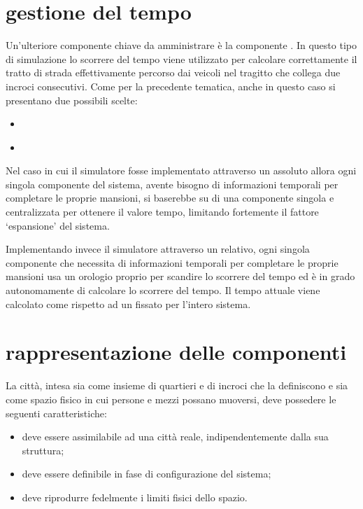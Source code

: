 \section*{gestione del tempo}
\label{problematiche_gestione_del_tempo}
Un'ulteriore componente chiave da amministrare è la componente . In questo tipo di simulazione lo scorrere del tempo viene utilizzato per calcolare correttamente il tratto di strada effettivamente percorso dai veicoli nel tragitto che collega due incroci consecutivi. Come per la precedente tematica, anche in questo caso si presentano due possibili scelte:

\begin{itemize}
\item{ }
\item{ }
\end{itemize}

Nel caso in cui il simulatore fosse implementato attraverso un  assoluto allora ogni singola componente del sistema, avente bisogno di informazioni temporali per completare le proprie mansioni, si baserebbe su di una componente singola e centralizzata per ottenere il valore tempo, limitando fortemente il fattore `espansione' del sistema.

Implementando invece il simulatore attraverso un  relativo, ogni singola componente che necessita di informazioni temporali per completare le proprie mansioni usa un orologio proprio per scandire lo scorrere del tempo ed è in grado autonomamente di calcolare lo scorrere del tempo. Il tempo attuale viene calcolato come  rispetto ad un  fissato per l'intero sistema.

\section*{rappresentazione delle componenti}
\label{problematiche_rappresentazione_delle_componenti}
La città, intesa sia come insieme di quartieri e di incroci che la definiscono e sia come spazio fisico in cui persone e mezzi possano muoversi, deve possedere le seguenti caratteristiche:

\begin{itemize}
\item{deve essere assimilabile ad una città reale, indipendentemente dalla sua struttura;}
\item{deve essere definibile in fase di configurazione del sistema;}
\item{deve riprodurre fedelmente i limiti fisici dello spazio.}
\end{itemize}

